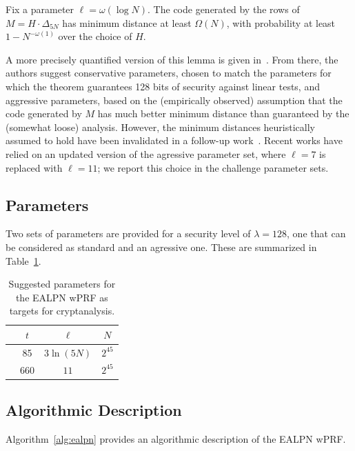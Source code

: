 \begin{lemma}
Fix a parameter $\ell = \omega(\log N)$. The code generated by the rows of  $M = H \cdot \Delta_{5N}$ has minimum distance at least $\Omega(N)$, with probability at least $1 - N^{-\omega(1)}$ over the choice of $H$.
\end{lemma}

A more precisely quantified version of this lemma is given in~\cite[Theorem 3.10]{C:BCGIKR22}. From there, the authors suggest conservative parameters, chosen to match the parameters for which the theorem guarantees 128 bits of security against linear tests, and aggressive parameters, based on the (empirically observed) assumption that the code generated by $M$ has much better minimum distance than guaranteed by the (somewhat loose) analysis. However, the minimum distances heuristically assumed to hold have been invalidated in a follow-up work~\cite{C:RagRinTan23}. Recent works have relied on an updated version of the agressive parameter set, where $\ell=7$ is replaced with $\ell=11$; we report this choice in the challenge parameter sets.

\subsection{Parameters}

Two sets of parameters are provided for a security level of $\lambda = 128$, one that can be considered as standard and an agressive one. These are summarized in Table~\ref{tab:parameters_ealpn}.

\begin{table}[!ht]
\centering
\begin{tabular}{lccc}
\toprule
& $t$ & $\ell$ & $N$ \\
\midrule
&85 & $3\ln(5N)$ & $2^{45}$ \\ 
&660 & $11$ & $2^{45}$ \\ 
\bottomrule
\end{tabular}
\caption{\label{tab:parameters_ealpn}Suggested parameters for the {\sf EALPN} wPRF as targets for cryptanalysis.}
\end{table}


\subsection{Algorithmic Description}

Algorithm~\ref{alg:ealpn} provides an algorithmic description of the {\sf EALPN} wPRF.

